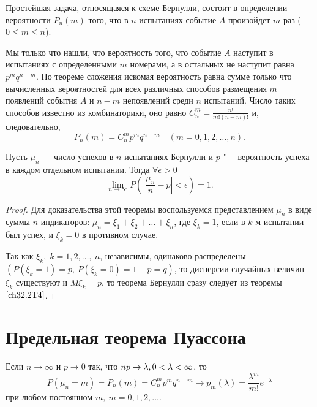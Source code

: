 Простейшая задача, относящаяся к схеме Бернулли, состоит в определении вероятности $P_n(m)$ того, что в $n$ испытаниях событие $A$ произойдет $m$ раз ($0 \le m \le n$).

Мы только что нашли, что вероятность того, что событие $A$ наступит в испытаниях с определенными $m$ номерами, а в остальных не наступит равна $p^mq^{n - m}$. По теореме сложения искомая вероятность равна сумме только что вычисленных вероятностей для всех различных способов размещения $m$ появлений события $A$ и $n - m$ непоявлений среди $n$ испытаний. Число таких способов известно из комбинаторики, оно равно 	$C_n^m = \frac{n!}{m!(n - m)!}$ и, следовательно,
\begin{equation} \label{ch32.1.1eq1}
P_n(m) = C_n^m p^mq^{n - m} \quad (m = 0,1,2,\ldots,n).
\end{equation}

\begin{thm} [Бернулли]
Пусть $\mu_n$ --- число успехов в $n$ испытаниях Бернулли и $p$ "--- вероятность успеха в каждом отдельном испытании. Тогда $\forall \epsilon > 0$
\begin{equation} \label{ch32.2eq7}
\lim_{n \to \infty} P \left( \left| \frac{\mu_n}{n} - p \right| < \epsilon \right) = 1.
\end{equation}
\end{thm}

\begin{proof}
Для доказательства этой теоремы воспользуемся представлением $\mu_n$ в виде суммы $n$ индикаторов: $\mu_n = \xi_1 + \xi_2 + \ldots + \xi_n$, где $\xi_k = 1$, если в $k$-м испытании был успех, и $\xi_k  = 0$ в противном случае.

Так как $\xi_k,\; k = 1,2,\ldots, \: n$, независимы, одинаково распределены $(P( \xi_k = 1) = p, \,P( \xi_k = 0) = 1 - p = q)$, то дисперсии случайных величин $\xi_k$ существуют и $M  \xi_k = p$, то теорема Бернулли сразу следует из теоремы $\ref{ch32.2T4}$.
\end{proof}

\section{Предельная теорема Пуассона}
\begin{thm} [Пуассона]
Если $n \to \infty$ и $p \to 0$ так, что $np \to \lambda, \:\\ 0 < \lambda < \infty$, то
$$
P(\mu_n = m) = P_n(m) = C_n^m p^mq^{n - m} \to p_m(\lambda) = \frac{\lambda^m}{m!} e^{-\lambda}
$$
при любом постоянном $m, \: m = 0,1,2,\dots$.
\end{thm}

